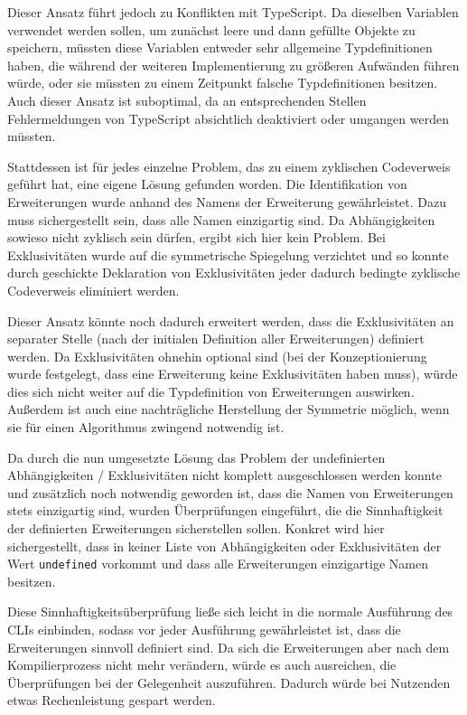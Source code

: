Dieser Ansatz führt jedoch zu Konflikten mit TypeScript. Da dieselben Variablen verwendet werden sollen, um zunächst leere und dann gefüllte Objekte zu speichern, müssten diese Variablen entweder sehr allgemeine Typdefinitionen haben, die während der weiteren Implementierung zu größeren Aufwänden führen würde, oder sie müssten zu einem Zeitpunkt falsche Typdefinitionen besitzen. Auch dieser Ansatz ist suboptimal, da an entsprechenden Stellen Fehlermeldungen von TypeScript absichtlich deaktiviert oder umgangen werden müssten.

Stattdessen ist für jedes einzelne Problem, das zu einem zyklischen Codeverweis geführt hat, eine eigene Lösung gefunden worden. Die Identifikation von Erweiterungen wurde anhand des Namens der Erweiterung gewährleistet. Dazu muss sichergestellt sein, dass alle Namen einzigartig sind. Da Abhängigkeiten sowieso nicht zyklisch sein dürfen, ergibt sich hier kein Problem. Bei Exklusivitäten wurde auf die symmetrische Spiegelung verzichtet und so konnte durch geschickte Deklaration von Exklusivitäten jeder dadurch bedingte zyklische Codeverweis eliminiert werden.

Dieser Ansatz könnte noch dadurch erweitert werden, dass die Exklusivitäten an separater Stelle (nach der initialen Definition aller Erweiterungen) definiert werden. Da Exklusivitäten ohnehin optional sind (bei der Konzeptionierung wurde festgelegt, dass eine Erweiterung keine Exklusivitäten haben muss), würde dies sich nicht weiter auf die Typdefinition von Erweiterungen auswirken. Außerdem ist auch eine nachträgliche Herstellung der Symmetrie möglich, wenn sie für einen Algorithmus zwingend notwendig ist.

Da durch die nun umgesetzte Lösung das Problem der undefinierten Abhängigkeiten / Exklusivitäten nicht komplett ausgeschlossen werden konnte und zusätzlich noch notwendig geworden ist, dass die Namen von Erweiterungen stets einzigartig sind, wurden Überprüfungen eingeführt, die die Sinnhaftigkeit der definierten Erweiterungen sicherstellen sollen. Konkret wird hier sichergestellt, dass in keiner Liste von Abhängigkeiten oder Exklusivitäten der Wert \verb|undefined| vorkommt und dass alle Erweiterungen einzigartige Namen besitzen.

Diese Sinnhaftigkeitsüberprüfung ließe sich leicht in die normale Ausführung des \gls{CLI}s einbinden, sodass vor jeder Ausführung gewährleistet ist, dass die Erweiterungen sinnvoll definiert sind. Da sich die Erweiterungen aber nach dem Kompilierprozess nicht mehr verändern, würde es auch ausreichen, die Überprüfungen bei der Gelegenheit auszuführen. Dadurch würde bei Nutzenden etwas Rechenleistung gespart werden.

